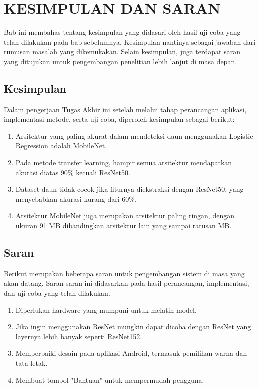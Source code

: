 \chapter{KESIMPULAN DAN SARAN}
Bab ini membahas tentang kesimpulan yang didasari oleh hasil uji coba yang telah dilakukan pada bab sebelumnya. Kesimpulan nantinya sebagai jawaban dari rumusan masalah yang dikemukakan. Selain kesimpulan, juga terdapat saran yang ditujukan untuk pengembangan penelitian lebih lanjut di masa depan.

\section{Kesimpulan}
Dalam pengerjaan Tugas Akhir ini setelah melalui tahap perancangan aplikasi, implementasi metode, serta uji coba, diperoleh kesimpulan sebagai berikut:

\begin{enumerate}
	\item Arsitektur yang paling akurat dalam mendeteksi daun menggunakan Logistic Regression adalah MobileNet.
	\item Pada metode transfer learning, hampir semua arsitektur mendapatkan akurasi diatas 90\% kecuali ResNet50.
	\item Dataset daun tidak cocok jika fiturnya diekstraksi dengan ResNet50, yang menyebabkan akurasi kurang dari 60\%.
	\item Arsitektur MobileNet juga merupakan arsitektur paling ringan, dengan ukuran 91 MB dibandingkan arsitektur lain yang sampai ratusan MB.
\end{enumerate}

\section{Saran}
Berikut merupakan beberapa saran untuk pengembangan sistem di masa yang akan datang. Saran-saran ini didasarkan pada hasil perancangan, implementasi, dan uji coba yang telah dilakukan.
\begin{enumerate}
	\item Diperlukan hardware yang mumpuni untuk melatih model.
	\item Jika ingin menggunakan ResNet mungkin dapat dicoba dengan ResNet yang layernya lebih banyak seperti ResNet152.
	\item Memperbaiki desain pada aplikasi Android, termasuk pemilihan warna dan tata letak.
	\item Membuat tombol "Bantuan" untuk mempermudah pengguna.
\end{enumerate}